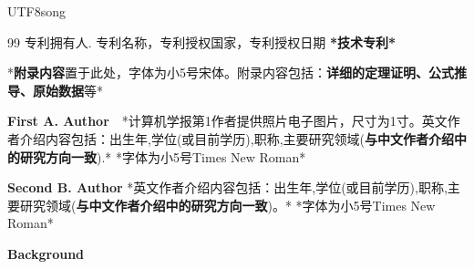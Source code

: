 \documentclass[10.5pt,compsoc]{CjC}
\theoremstyle{mystyle}
\begin{document}
\begin{CJK*}{UTF8}{song}
\begin{thebibliography}{99}
专利拥有人. 专利名称，专利授权国家，专利授权日期
\textbf{*技术专利*}
  \end{thebibliography}

\begin{strip}
\end{strip}


{\setlength\parindent{2em}
*\textbf{附录内容}置于此处，字体为小5号宋体。附录内容包括：\textbf{详细的定理证明、公式推导、原始数据}等*}

\begin{strip}
\end{strip}

\begin{biography}
\noindent
\textbf{First A. Author}\ \ *计算机学报第1作者提供照片电子图片，尺寸为1寸。英文作者介绍内容包括：出生年,学位(或目前学历),职称,主要研究领域(\textbf{与中文作者介绍中的研究方向一致}).*
*字体为小5号Times New Roman*

\end{biography}

\begin{biography}
\noindent
\textbf{Second B. Author} *英文作者介绍内容包括：出生年,学位(或目前学历),职称,主要研究领域(\textbf{与中文作者介绍中的研究方向一致})。*
*字体为小5号Times New Roman*
\end{biography}
\begin{strip}
\end{strip}
\noindent \textbf{Background}


\end{CJK*}
\end{document}
